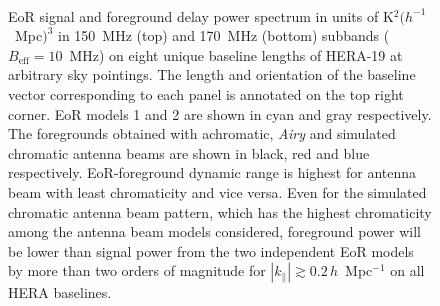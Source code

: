 \documentclass[preprint2,iop,numberedappendix,twocolappendix,appendixfloats]{emulateapj}
\begin{document}
\begin{figure}[htb]
\centering
{} \\
\caption{EoR signal and foreground delay power spectrum in units of K$^2 (h^{-1}$~Mpc$)^3$ in 150~MHz (top) and 170~MHz (bottom) subbands ($B_\textrm{eff}=10$~MHz) on eight unique baseline lengths of HERA-19 at arbitrary sky pointings. The length and orientation of the baseline vector corresponding to each panel is annotated on the top right corner. EoR models 1 and 2 are shown in cyan and gray respectively. The foregrounds obtained with achromatic, {\it Airy} and simulated chromatic antenna beams are shown in black, red and blue respectively. EoR-foreground dynamic range is highest for antenna beam with least chromaticity and vice versa. Even for the simulated chromatic antenna beam pattern, which has the highest chromaticity among the antenna beam models considered, foreground power will be lower than signal power from the two independent EoR models by more than two orders of magnitude for $|k_\parallel| \gtrsim 0.2\,h$~Mpc$^{-1}$ on all HERA baselines.}
\label{fig:subbands}
\end{figure}
\end{document}
